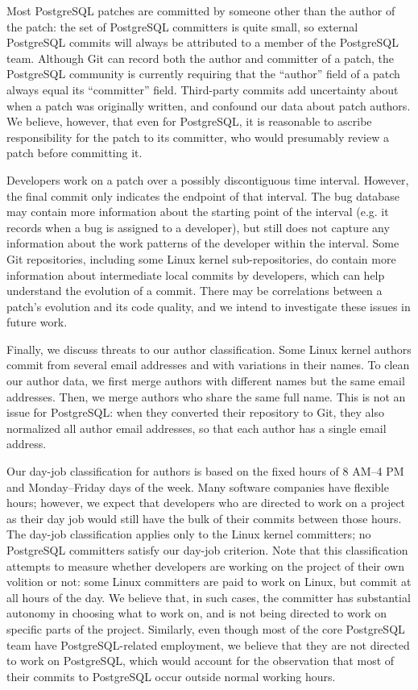 Most PostgreSQL patches are committed by someone other than the author of the
patch: the set of PostgreSQL committers is quite small, so external PostgreSQL
commits will always be attributed to a member of the PostgreSQL team. Although
Git can record both the author and committer of a patch, the PostgreSQL
community is currently requiring that the ``author'' field of a patch always
equal its ``committer'' field. Third-party commits add uncertainty about
when a patch was originally written, and confound our data about patch authors.
We believe, however, that even for PostgreSQL, it is reasonable to ascribe
responsibility for the patch to its committer, who would presumably review a
patch before committing it.

Developers work on a patch over a possibly discontiguous time interval. However,
the final commit only indicates the endpoint of that interval. The bug database
may contain more information about the starting point of the interval (e.g. it
records when a bug is assigned to a developer), but still does not capture any
information about the work patterns of the developer within the interval. Some
Git repositories, including some Linux kernel sub-repositories, do contain more
information about intermediate local commits by developers, which can help
understand the evolution of a commit. There may be correlations between a
patch's evolution and its code quality, and we intend to investigate these issues in
future work.

Finally, we discuss threats to our author classification. Some Linux
kernel authors commit from several email addresses and with variations
in their names. To clean our author data, we first merge authors with
different names but the same email addresses. Then, we merge authors
who share the same full name. This is not an issue for PostgreSQL:
when they converted their repository to Git, they also normalized all
author email addresses, so that each author has a single email
address.

Our day-job classification for authors is based on the fixed hours of
8 AM--4 PM and Monday--Friday days of the week. Many software companies
have flexible hours; however, we expect that developers who are
directed to work on a project as their day job would still have the
bulk of their commits between those hours. The day-job classification
applies only to the Linux kernel committers; no PostgreSQL committers
satisfy our day-job criterion. Note that this classification attempts
to measure whether developers are working on the project of their own
volition or not: some Linux committers 
are paid to work on Linux, but commit at all hours of the day. 
We believe that, in
such cases, the committer has substantial autonomy in
choosing what to work on, and is not being directed to work on
specific parts of the project. Similarly, even though most of the
core PostgreSQL team have PostgreSQL-related employment, we believe
that they are not directed to work on PostgreSQL, which would account
for the observation that most of their commits to PostgreSQL occur
outside normal working hours.

